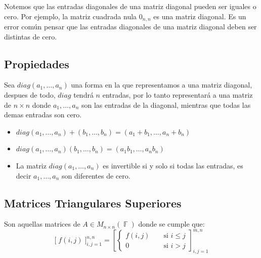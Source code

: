 \documentclass[12pt, fleqn]{report}                             %
\DeclareMathOperator \Space {\quad}                             %
\DeclareMathOperator \MiniSpace {\;}                            %
\theoremstyle{break}                                            %
\DeclareMathOperator \GenericField {\mathbb{F}}                 %
\newcommand{\Brackets}[1]    {\left[ #1 \right]}                %
\newcommand{\BigBrackets}[1] {\Big[ \; #1 \; \Big]}             %
\begin{document}
                Notemos que las entradas diagonales de una matriz diagonal pueden ser iguales o cero.
                Por ejemplo, la matriz cuadrada nula $0_{n, n}$ es una matriz diagonal.
                Es un error común pensar que las entradas diagonales de una matriz diagonal deben
                ser distintas de cero.


            \clearpage
            \subsection{Propiedades}

                Sea $diag(a_1, \dots, a_n)$ una forma en la que representamos a una matriz diagonal,
                despues de todo, $diag$ tendrá $n$ entradas, por lo tanto representará a una matriz
                de $n \times n$ donde $a_1, \dots, a_n$ son las entradas de la diagonal, mientras que
                todas las demas entradas son cero.

                \begin{itemize}
                    
                    \item
                        $diag(a_1, \dots, a_n) + (b_1, \dots, b_n) = (a_1+b_1, \dots, a_n+b_n)$

                    \item
                        $diag(a_1, \dots, a_n)(b_1, \dots, b_n) = (a_1b_1, \dots, a_nb_n)$

                    \item 
                        La matriz $diag(a_1, \dots, a_n)$ es invertible si y solo si todas las entradas, 
                        es decir $a_1, \dots, a_n$ son diferentes de cero. 

                \end{itemize}



            \clearpage
            \subsection{Matrices Triangulares Superiores}

                Son aquellas matrices de $A \in M_{n \times n}(\GenericField)$ donde se cumple que: 
                \begin{equation*}
                    \BigBrackets{f(i,j)}_{i, j = 1}^{n, n}
                    =
                    \Brackets{
                        \begin{cases}
                            f(i,j)  \MiniSpace& \text{ si } i \leq j \\
                            0       \MiniSpace& \text{ si } i > j
                        \end{cases}
                    }_{i, j = 1}^{m, n}  
                \end{equation*}
\end{document}
